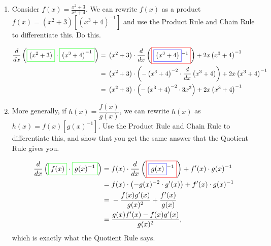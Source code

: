 \documentclass{article}
\begin{document}
\begin{enumerate}
  \begin{enumerate}
  \item
    \begin{problem}[\vfill]
      Consider $f(x) = \displaystyle \frac{x^2 + 3}{x^3 + 4}$.  We can
      rewrite $f(x)$ as a product $f(x) = \displaystyle (x^2 + 3) \left[
        (x^3 + 4)^{-1} \right]$ and use the Product Rule and Chain Rule
      to differentiate this.  Do this.
    \end{problem}

    \begin{solution}
      \begin{align*}
        \frac{d}{dx} \left(\fcolorbox{green}{white}{$\displaystyle
            \left(x^ { 2} + 3\right)$}\cdot
          \fcolorbox{green}{white}{$\displaystyle  \left(x^3 +
              4\right)^ { -1} $}\right) = {} & \left(x^ { 2} +
          3\right)\cdot \frac{d}{dx}
        \left(\fcolorbox{red}{white}{$\displaystyle
            \fcolorbox{blue}{white}{$\displaystyle \left(x^3 + 4\right)$}^ { -1}
            $}\right)+ 2 x \left(x^3 + 4\right)^ {
          -1}  \\ 
        = {} & \left(x^ { 2} + 3\right)\cdot \left(-\left(x^3+4\right)^ { -2} \cdot \frac{d}{dx}\left(x^3 +
            4\right)\right)+ 2 x \left(x^3 +
          4\right)^ { -1}  \\ 
        = {} & \left(x^ { 2} + 3\right)\cdot \left(-\left(x^3 +
            4\right)^ { -2} \cdot 3x^2 \right)+
        2 x \left(x^3 + 4\right)^ { -1}
      \end{align*}
    \end{solution}

  \item
\begin{problem}[\vfill]
      More generally, if $h(x) = \dfrac{f(x)}{g(x)}$, we can rewrite
      $h(x)$ as $h(x) = f(x) [g(x)^{-1}]$.  Use the Product Rule and Chain
      Rule to differentiate this, and show that you get the same answer
      that the Quotient Rule gives you.
    \end{problem}

    \begin{solution}
      \begin{align*}
        \frac{d}{dx} \left(\fcolorbox{green}{white}{$\displaystyle f(x)$}\cdot \fcolorbox{green}{white}{$\displaystyle g(x)^ { -1} $}\right) = {} & f(x)\cdot \frac{d}{dx} \left(\fcolorbox{red}{white}{$\displaystyle \fcolorbox{blue}{white}{$\displaystyle g(x)$}^ { -1} $}\right)+ f'(x)\cdot g(x)^ { -1}  \\
        = {} & f(x)\cdot \left(-g(x)^ { -2} \cdot
          g'(x)\right)+ f'(x)\cdot g(x)^ { -1}
        \\
        = {} & - \frac{f(x) g'(x)}{g(x)^2} + \frac{f'(x)}{g(x)} \\
        = {} & \frac{g(x) f'(x) - f(x) g'(x)}{g(x)^2},
      \end{align*}
      which is exactly what the Quotient Rule says. 
    \end{solution}
  \end{enumerate} 


\end{enumerate}
\end{document}
